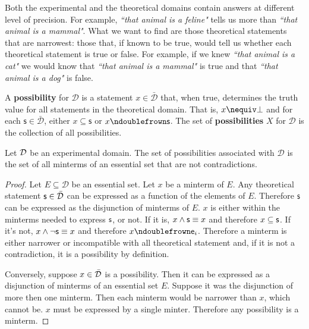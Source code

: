 \documentclass[11pt,letterpaper,fleqn]{memoir} %
\begin{document}
Both the experimental and the theoretical domains contain answers at different level of precision. For example, \emph{``that animal is a feline"} tells us more than \emph{``that animal is a mammal"}. What we want to find are those theoretical statements that are narrowest: those that, if known to be true, would tell us whether each theoretical statement is true or false. For example, if we knew \emph{``that animal is a cat"} we would know that \emph{``that animal is a mammal"} is true and that \emph{``that animal is a dog"} is false.

\begin{mathSection}

\begin{defn}
	A \textbf{possibility} for $\mathcal{D}$ is a statement $x \in \bar{\mathcal{D}}$ that, when true, determines the truth value for all statements in the theoretical domain. That is, $x \nequiv \contradiction$ and for each $\mathsf{s} \in \bar{\mathcal{D}}$, either $x \subseteq \mathsf{s}$ or $x \ncomp \mathsf{s}$. The set of \textbf{possibilities} $X$ for $\mathcal{D}$ is the collection of all possibilities.
\end{defn}
	
\begin{prop}
	Let $\mathcal{D}$ be an experimental domain. The set of possibilities associated with $\mathcal{D}$ is the set of all minterms of an essential set that are not contradictions.
\end{prop}

\begin{proof}
	Let $E \subseteq \mathcal{D}$ be an essential set. Let $x$ be a minterm of $E$. Any theoretical statement $\mathsf{s} \in \bar{\mathcal{D}}$ can be expressed as a function of the elements of $E$. Therefore $\mathsf{s}$ can be expressed as the disjunction of minterms of $E$. $x$ is either within the minterms needed to express $\mathsf{s}$, or not. If it is, $x \wedge \mathsf{s} \equiv x$ and therefore $x \subseteq \mathsf{s}$. If it's not, $x \wedge \neg \mathsf{s} \equiv x$ and therefore $x \ncomp \obs[e]_i$. Therefore a minterm is either narrower or incompatible with all theoretical statement and, if it is not a contradiction, it is a possibility by definition.
	
	Conversely, suppose $x \in \bar{\mathcal{D}}$ is a possibility. Then it can be expressed as a disjunction of minterms of an essential set $E$. Suppose it was the disjunction of more then one minterm. Then each minterm would be narrower than $x$, which cannot be. $x$ must be expressed by a single minter. Therefore any possibility is a minterm.
\end{proof}


\end{mathSection}
\end{document}
